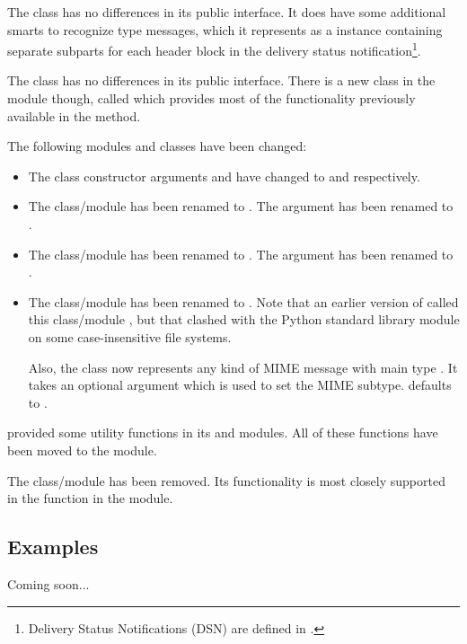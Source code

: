 The  class has no differences in its public interface.
It does have some additional smarts to recognize
 type messages, which it represents as
a  instance containing separate 
subparts for each header block in the delivery status
notification\footnote{Delivery Status Notifications (DSN) are defined
in .}.

The  class has no differences in its public
interface.  There is a new class in the 
module though, called  which provides most of
the functionality previously available in the
 method.

The following modules and classes have been changed:

\begin{itemize}
\item The  class constructor arguments 
      and  have changed to  and
       respectively.
\item The  class/module has been renamed to
      .  The  argument has been renamed to
      .
\item The  class/module has been renamed to
      .  The  argument has been renamed to
      .
\item The  class/module has been renamed to
      .  Note that an earlier version of
       called this class/module , but
      that clashed with the Python standard library module
       on some case-insensitive file systems.

      Also, the  class now represents any kind of
      MIME message with main type .  It takes an
      optional argument  which is used to set the MIME
      subtype.   defaults to .
\end{itemize}

 provided some utility functions in its
 and  modules.  All of these functions
have been moved to the  module.

The  class/module has been removed.  Its functionality
is most closely supported in the 
function in the  module.

\subsection{Examples}

Coming soon...
